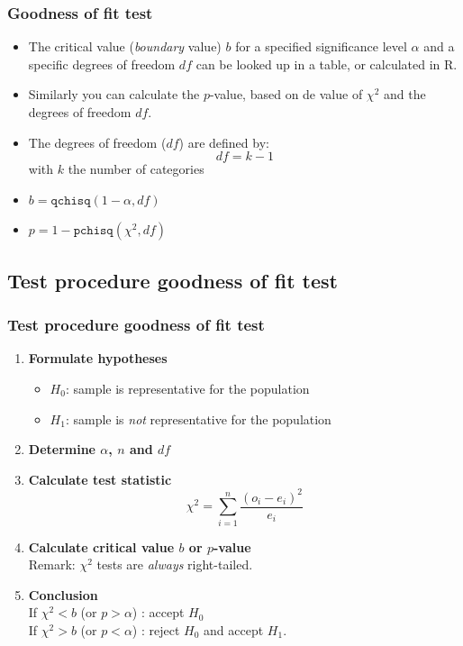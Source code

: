 \documentclass{beamer}
\begin{document}
\begin{frame}
\frametitle{Goodness of fit test}

\begin{itemize}
    \item The critical value (\textit{boundary} value) $b$ for a specified significance level $\alpha$ and a specific degrees of freedom $df$ can be looked up in a table, or calculated in R.
\vfill
    \item Similarly you can calculate the $p$-value, based on de value of $\chi^2$ and the degrees of freedom $df$.
\vfill
    \item The degrees of freedom ($df$) are defined by:
    \[ df = k -1 \]
    with $k$ the number of categories
\vfill 
    \item $b = \texttt{qchisq}(1-\alpha,df)$
    \item $p = 1-\texttt{pchisq}(\chi^2,df)$
\end{itemize}
\end{frame}

\subsection{Test procedure goodness of fit test}

\begin{frame}
  \frametitle{Test procedure goodness of fit test}
  \begin{enumerate}
  \item \textbf{Formulate hypotheses}
    \begin{itemize}
      \item $H_{0}$: sample is representative for the population
      \item $H_{1}$: sample is \emph{not} representative for the population
    \end{itemize}
  \item \textbf{Determine $\alpha$, $n$ and $df$}
  \item \textbf{Calculate test statistic}
  \[ \chi^{2} = \sum_{i=1}^{n} \frac{(o_{i} - e_{i})^{2}}{e_{i}} \]
  \item \textbf{Calculate critical value $b$ or $p$-value}\\
  Remark: $\chi^2$ tests are \emph{always} right-tailed.
  \item \textbf{Conclusion}\\
   If $\chi^2 < b$ (or $p > \alpha$) : accept $H_{0}$\\
   If $\chi^2 > b$ (or $p < \alpha$) : reject $H_{0}$ and accept $H_{1}$.
\end{enumerate}
\end{frame}
\end{document}
